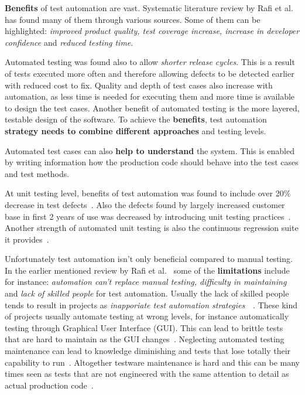     \textbf{Benefits} of test automation are vast. Systematic literature review by Rafi et al.~\cite{rafi2012benefits} has found many
    of them through various sources. Some of them can be highlighted: \textit{improved product quality, test coverage increase,
    increase in developer confidence} and \textit{reduced testing time}.

    Automated testing was found also to allow \textit{shorter release cycles}. This is a result of
    tests executed more often and therefore allowing defects to be detected earlier with reduced cost to fix.
    Quality and depth of test cases also increase with automation, as less time is needed for executing them and more time is available
    to design the test cases. Another benefit of automated testing is the more layered, testable design of the software.
    To achieve the \textbf{benefits}, test automation \textbf{strategy needs to combine different approaches} and testing levels. ~\cite{berner2005observations}

    Automated test cases can also \textbf{help to understand} the system. This is enabled by writing information how the production code should behave
    into the test cases and test methods. ~\cite{langr2015pragmatic}~\cite{chelimsky2010rspec}~\cite{kapelonis2016java}

    At unit testing level, benefits of test automation was found to include over 20\% decrease in test defects~\cite{williams2009effectiveness}.
    Also the defects found by largely increased customer base in first 2 years of use was decreased by introducing unit testing practices~\cite{williams2009effectiveness}.
    Another strength of automated unit testing is also the continuous regression suite it provides~\cite{runeson2006survey}.

    Unfortunately test automation isn't only beneficial compared to manual testing. In the earlier mentioned review by Rafi et al.~\cite{rafi2012benefits}
    some of the \textbf{limitations} include for instance: \textit{automation can't replace manual testing, difficulty in maintaining}
    and \textit{lack of skilled people} for test automation. Usually the lack of skilled people tends to result in projects as
    \textit{inapporiate test automation strategies}~\cite{rafi2012benefits}~\cite{berner2005observations}. These kind of projects
    usually automate testing at wrong levels, for instance automatically testing through Graphical User Interface (GUI). This
    can lead to brittle tests that are hard to maintain as the GUI changes~\cite{berner2005observations}. Neglecting automated
    testing maintenance can lead to knowledge diminishing and tests that lose totally their capability to run~\cite{berner2005observations}.
    Altogether testware maintenance is hard and this can be many times seen as tests that are not engineered
    with the same attention to detail as actual production code~\cite{berner2005observations}.

